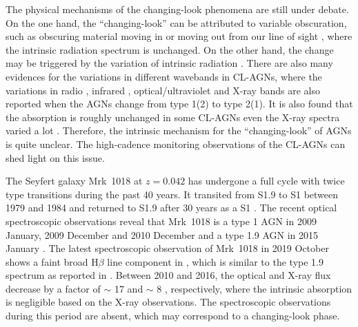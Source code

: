 The physical mechanisms of the changing-look phenomena are still under debate. On the one hand, the ``changing-look'' can be attributed to variable obscuration, such as obscuring material moving in or moving out from our line of sight \citep[e.g.][]{2013MNRAS.436.1615M,2014MNRAS.443.2862A,2015ApJ...815...55R,2018MNRAS.481.2470T}, where the intrinsic radiation spectrum is unchanged. On the other hand, the change may be triggered by the variation of intrinsic radiation \citep[e.g., the change of accretion disk，][]{1984MNRAS.211P..33P,2014MNRAS.438.3340E}. There are also many evidences for the variations in different wavebands in CL-AGNs, where the variations in radio \citep[e.g.][]{2016MNRAS.460..304K}, infrared \citep[e.g.][]{2017ApJ...846L...7S,2018ApJ...864...27S}, optical/ultraviolet \citep[e.g.][]{2019ApJ...885...44D} and X-ray \citep[e.g.][]{2016MNRAS.461.1927P,2019MNRAS.483L..88P,2020ApJ...898L...1R} bands are also reported when the AGNs change from type 1(2) to type 2(1). It is also found that the absorption is roughly unchanged in some CL-AGNs even the X-ray spectra varied a lot \citep[e.g.][]{2016A&A...593L...9H,2020ApJ...890L..29A,2020ApJ...901....1W}. Therefore, the intrinsic mechanism for the ``changing-look'' of AGNs is quite unclear. The high-cadence monitoring observations of the CL-AGNs can shed light on this issue. 

The Seyfert galaxy Mrk~1018 at $z=0.042$ has undergone a full cycle with twice type transitions during the past 40 years. It transited from S1.9 to S1 between 1979 and 1984 \citep{1986ApJ...311..135C} and returned to S1.9 after 30 years as a S1 \citep[see also][]{2016A&A...593L...8M,2016A&A...593L...9H,2017A&A...607L...9K}. The recent optical spectroscopic observations reveal that Mrk~1018 is a type 1 AGN in 2009 January, 2009 December and 2010 December and a type 1.9 AGN in 2015 January \citep{2016A&A...593L...8M,2018ApJ...861...51K}. The latest spectroscopic observation of Mrk~1018 in 2019 October shows a faint broad H$\beta$ line component in \citet{2020A&A...644L...5H}, which is similar to the type 1.9 spectrum as reported in \citet[][]{2016A&A...593L...8M}. Between 2010 and 2016, the optical and X-ray flux decrease by a factor of $\sim$ 17 and $\sim$ 8 \citep{2016A&A...593L...9H}, respectively, where the intrinsic absorption is negligible based on the X-ray observations. The spectroscopic observations during this period are absent, which may correspond to a changing-look phase.

